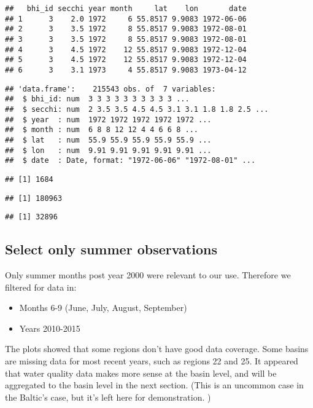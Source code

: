 \documentclass[
]{article}
\providecommand{\tightlist}{%
  \setlength{\itemsep}{0pt}\setlength{\parskip}{0pt}}
\begin{document}
\begin{verbatim}
##   bhi_id secchi year month     lat    lon       date
## 1      3    2.0 1972     6 55.8517 9.9083 1972-06-06
## 2      3    3.5 1972     8 55.8517 9.9083 1972-08-01
## 3      3    3.5 1972     8 55.8517 9.9083 1972-08-01
## 4      3    4.5 1972    12 55.8517 9.9083 1972-12-04
## 5      3    4.5 1972    12 55.8517 9.9083 1972-12-04
## 6      3    3.1 1973     4 55.8517 9.9083 1973-04-12
\end{verbatim}

\begin{verbatim}
## 'data.frame':    215543 obs. of  7 variables:
##  $ bhi_id: num  3 3 3 3 3 3 3 3 3 3 ...
##  $ secchi: num  2 3.5 3.5 4.5 4.5 3.1 3.1 1.8 1.8 2.5 ...
##  $ year  : num  1972 1972 1972 1972 1972 ...
##  $ month : num  6 8 8 12 12 4 4 6 6 8 ...
##  $ lat   : num  55.9 55.9 55.9 55.9 55.9 ...
##  $ lon   : num  9.91 9.91 9.91 9.91 9.91 ...
##  $ date  : Date, format: "1972-06-06" "1972-08-01" ...
\end{verbatim}

\begin{verbatim}
## [1] 1684
\end{verbatim}

\begin{verbatim}
## [1] 180963
\end{verbatim}

\begin{verbatim}
## [1] 32896
\end{verbatim}

\hypertarget{select-only-summer-observations}{%
\subsection{Select only summer
observations}\label{select-only-summer-observations}}

Only summer months post year 2000 were relevant to our use. Therefore we
filtered for data in:

\begin{itemize}
\tightlist
\item
  Months 6-9 (June, July, August, September)\\
\item
  Years 2010-2015
\end{itemize}

The plots showed that some regions don't have good data coverage. Some
basins are missing data for most recent years, such as regions 22 and
25. It appeared that water quality data makes more sense at the basin
level, and will be aggregated to the basin level in the next section.
(This is an uncommon case in the Baltic's case, but it's left here for
demonstration. )
\end{document}

